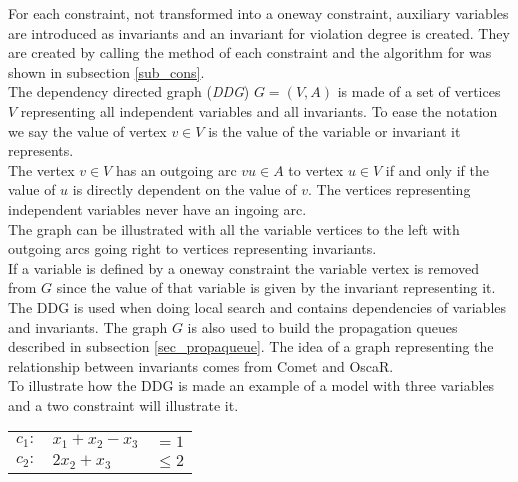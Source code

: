 For each constraint, not transformed into a oneway constraint, auxiliary variables are introduced as invariants and an 
invariant for violation degree is created. They are created by calling the method  of each 
constraint and the algorithm for  was shown in subsection \ref{sub_cons}. \\
The dependency directed graph (\emph{DDG}) $G=(V,A)$ is made of a set of vertices $V$ representing all independent 
variables and all invariants. To ease the notation we say the value of vertex $v \in V$ is the value of the variable or 
invariant it represents. \\
The vertex $v \in V$ has an outgoing arc $vu \in A$ to vertex $u \in V$ if and only if the value of $u$ is directly 
dependent on the value of $v$. The vertices representing independent variables never have an ingoing arc. \\ 
The graph can be illustrated with all the variable vertices to the left with outgoing arcs going right to vertices 
representing invariants. \\  
If a variable is defined by a oneway constraint the variable vertex is removed from $G$ since the value of that 
variable is given by the invariant representing it. \\  
The DDG is used when doing local search and contains dependencies of variables and invariants. The 
graph $G$ is also used to build 
the propagation queues described in subsection \ref{sec_propaqueue}. The idea of a graph representing the relationship 
between invariants comes from Comet \cite[p. 97]{comet} and OscaR\cite[p. 7-9]{oscar}. \\
To illustrate how the DDG is made an example of a model with three variables and a two constraint will 
illustrate it. 
\begin{center}
\begin{tabular}{rlr}
$ c_1: $&$x_1 + x_2 - x_3 $&$= 1$ \\
$ c_2: $&$2x_2 + x_3 $&$\leq 2$ \\
\end{tabular} 
\end{center}
